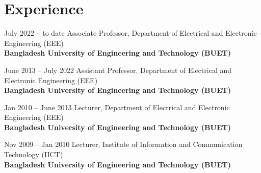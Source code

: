 \documentclass[cvauthor={Dr. Sajid Muhaimin Choudhury}]{buetcv}
\begin{document}
\section{Experience}
        \begin{twocolentry}{
        July 2022 – to date 
        }
        Associate Professor, Department of Electrical and Electronic Engineering (EEE) \\ \textbf{Bangladesh University of Engineering and Technology (BUET)} \\
        \end{twocolentry}
        
        \begin{twocolentry}{
            June 2013 – July 2022
            }
            Assistant Professor, Department of Electrical and Electronic Engineering (EEE) \\ \textbf{Bangladesh University of Engineering and Technology (BUET)} \\
        \end{twocolentry}

        \begin{twocolentry}{
            Jan 2010 – June 2013
            }
            Lecturer, Department of Electrical and Electronic Engineering (EEE) \\ \textbf{Bangladesh University of Engineering and Technology (BUET)}\\
        \end{twocolentry}

        \begin{twocolentry}{
            Nov 2009 – Jan 2010
            }
            Lecturer, Institute of Information and Communication Technology (IICT) \\ \textbf{Bangladesh University of Engineering and Technology (BUET)}\\
        \end{twocolentry}        
    
\end{document}
